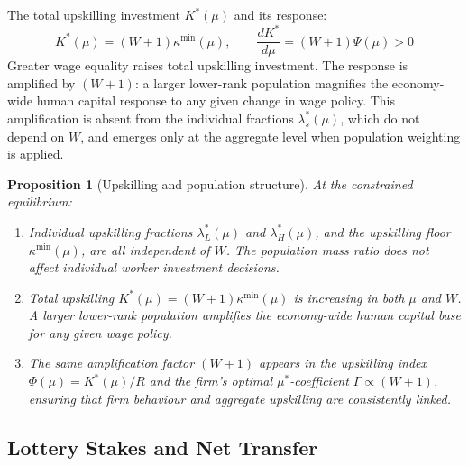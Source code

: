 \documentclass[12pt,a4paper]{article}
\newtheorem{proposition}{Proposition}
\begin{document}
The total upskilling investment $K^*(\mu)$ and its response:
\begin{equation}
  K^*(\mu) = (W+1)\kappa^{\min}(\mu),
  \qquad
  \frac{dK^*}{d\mu} = (W+1)\Psi(\mu) > 0
  \label{eq:dK_dmu}
\end{equation}
Greater wage equality raises total upskilling investment. The response
is amplified by $(W+1)$: a larger lower-rank population magnifies the
economy-wide human capital response to any given change in wage policy.
This amplification is absent from the individual fractions
$\lambda_s^*(\mu)$, which do not depend on $W$, and emerges only at
the aggregate level when population weighting is applied.

\begin{proposition}[Upskilling and population structure]
\label{prop:upskilling}
At the constrained equilibrium:
\begin{enumerate}
  \item Individual upskilling fractions $\lambda_L^*(\mu)$ and
        $\lambda_H^*(\mu)$, and the upskilling floor $\kappa^{\min}(\mu)$,
        are all independent of $W$. The population mass ratio does not
        affect individual worker investment decisions.
  \item Total upskilling $K^*(\mu) = (W+1)\kappa^{\min}(\mu)$ is
        increasing in both $\mu$ and $W$. A larger lower-rank population
        amplifies the economy-wide human capital base for any given
        wage policy.
  \item The same amplification factor $(W+1)$ appears in the upskilling
        index $\Phi(\mu) = K^*(\mu)/R$ and the firm's optimal
        $\mu^*$-coefficient $\Gamma \propto (W+1)$, ensuring that firm
        behaviour and aggregate upskilling are consistently linked.
\end{enumerate}
\end{proposition}

\subsection{Lottery Stakes and Net Transfer}
\end{document}
